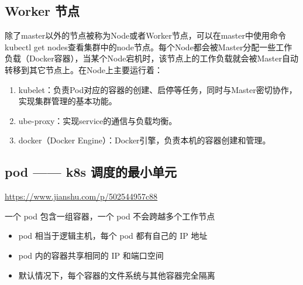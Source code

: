 \documentclass[12pt]{article}
\begin{document}
\subsection{Worker 节点}
除了master以外的节点被称为Node或者Worker节点，可以在master中使用命令 kubectl get nodes查看集群中的node节点。每个Node都会被Master分配一些工作负载（Docker容器），当某个Node宕机时，该节点上的工作负载就会被Master自动转移到其它节点上。在Node上主要运行着：
\begin{enumerate}
\setlength{\itemsep}{0pt}
\setlength{\parsep}{0pt}
\setlength{\parskip}{0pt}
    \item kubelet：负责Pod对应的容器的创建、启停等任务，同时与Master密切协作，实现集群管理的基本功能。
    \item ube-proxy：实现service的通信与负载均衡。
    \item docker（Docker Engine）：Docker引擎，负责本机的容器创建和管理。
\end{enumerate}

\subsection{pod —— k8s 调度的最小单元}
\url{https://www.jianshu.com/p/502544957c88}

一个 pod 包含一组容器，一个 pod 不会跨越多个工作节点
\begin{itemize}
\setlength{\itemsep}{0pt}
\setlength{\parsep}{0pt}
\setlength{\parskip}{0pt}
    \item pod 相当于逻辑主机，每个 pod 都有自己的 IP 地址
    \item pod 内的容器共享相同的 IP 和端口空间
    \item 默认情况下，每个容器的文件系统与其他容器完全隔离
\end{itemize}








\end{document}
